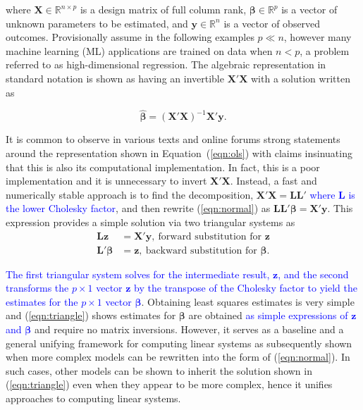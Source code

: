 \documentclass[12pt]{article}
\begin{document}
\noindent where $\bm{X}\in\mathbb{R}^{n \times p}$ is a design matrix of full column rank, $\bm{\beta} \in \mathbb{R}^p$ is a vector of unknown parameters to be estimated, and $\bm{y} \in \mathbb{R}^n$ is a vector of observed outcomes. Provisionally assume in the following examples $p \ll n$, however many machine learning (ML) applications are trained on data when $n < p$, a problem referred to as high-dimensional regression. The algebraic representation in standard notation is shown as having an invertible $\bm{X'X}$ with a solution written as

\begin{equation}
\label{eqn:ols}
\widehat{\bm{\beta}} = \bm{(X'X)}^{-1} \bm{X'y}.
\end{equation}

It is common to observe in various texts and online forums strong statements around the representation shown in Equation~(\ref{eqn:ols}) with claims insinuating that this is also its computational implementation. In fact, this is a poor implementation and it is unnecessary to invert $\bm{X'X}$. Instead, a fast and numerically stable approach \cite{JSSv052i05} is to find the decomposition, $\bm{X'X} = \bm{LL'}$ \textcolor{blue}{where $\bm{L}$ is the lower Cholesky factor}, and then rewrite (\ref{eqn:normal}) as $\bm{LL'\beta} = \bm{X'y}$. This expression provides a simple solution via two triangular systems as
\begin{align}
\label{eqn:triangle}
\bm{Lz}  & =  \bm{X'y}, \ \text{forward substitution for $\bm{z}$}\\
\bm{L'\beta}  &=  \bm{z}, \ \text{backward substitution for $\bm{\beta}$} \nonumber.  
\end{align}

\textcolor{blue}{The first triangular system solves for the intermediate result, $\bm{z}$, and the second transforms the $p \times 1$ vector $\bm{z}$ by the transpose of the Cholesky factor to yield the estimates for the $p \times 1$ vector $\bm{\beta}$}. Obtaining least squares estimates is very simple and (\ref{eqn:triangle}) shows estimates for $\bm{\beta}$ are obtained \textcolor{blue}{as simple expressions of $\bm{z}$ and $\bm{\beta}$} and require no matrix inversions. However, it serves as a baseline and a general unifying framework for computing linear systems as subsequently shown when more complex models can be rewritten into the form of (\ref{eqn:normal}). In such cases, other models can be shown to inherit the solution shown in (\ref{eqn:triangle}) even when they appear to be more complex, hence it unifies approaches to computing linear systems.
\end{document}
